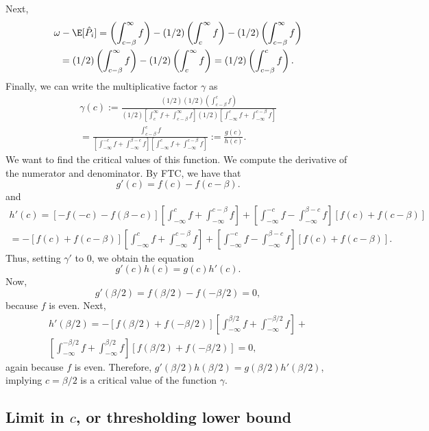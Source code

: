 \documentclass[12pt]{article}
\begin{document}
 Next,
\begin{multline*} \omega - \E[\hat{P}_i] = \left(\int_{c - \beta}^\infty f \right) - (1/2) \left( \int_{c}^\infty f \right) - (1/2) \left( \int_{c - \beta}^\infty f \right) \\ = (1/2) \left( \int_{c - \beta}^\infty f \right) - (1/2) \left( \int_{c}^\infty f \right) = (1/2) \left( \int_{c - \beta}^c f \right).\end{multline*} Finally, we can write the multiplicative factor $\gamma$ as
\begin{multline*} \gamma(c) := \frac{ (1/2)(1/2) \left(\int_{c - \beta}^c f\right) }{ (1/2) \left[\int_c^\infty f + \int_{c - \beta}^\infty f \right] (1/2) \left[\int_{-\infty}^c f + \int_{-\infty}^{c - \beta} f \right]} \\ = \frac{ \int_{c - \beta}^c f }{ \left[ \int_{-\infty}^{-c} f + \int_{-\infty}^{\beta - c} f \right] \left[ \int_{-\infty}^c f + \int_{-\infty}^{c - \beta} f \right] } := \frac{g(c)}{h(c)}.
\end{multline*} We want to find the critical values of this function. We compute the derivative of the numerator and denominator. By FTC, we have that
$$ g'(c) = f(c) - f(c - \beta).$$
and
\begin{multline*}
h'(c) = [-f(-c) - f(\beta - c)] \left[\int_{-\infty}^c f + \int_{-\infty}^{c - \beta} f \right] + \left[\int_{-\infty}^{-c} f -\int_{-\infty}^{\beta - c} f \right]\left[ f(c) + f(c - \beta) \right] \\= -[f(c) + f(c - \beta)] \left[\int_{-\infty}^c f + \int_{-\infty}^{c - \beta} f \right] + \left[\int_{-\infty}^{-c} f -\int_{-\infty}^{\beta - c} f \right]\left[ f(c) + f(c - \beta) \right].
\end{multline*} Thus, setting $\gamma'$ to $0$, we obtain the equation
$$ g'(c) h(c) = g(c) h'(c).$$
Now,
$$g'(\beta/2) = f(\beta/2) - f(-\beta/2) = 0,$$ because $f$ is even. Next, 
\begin{multline*}
h'(\beta/2) = - \left[ f(\beta/2) + f(-\beta/2) \right] \left[ \int_{-\infty}^{\beta/2} f + \int_{-\infty}^{-\beta/2} f \right] + \\ \left[\int_{-\infty}^{ -\beta/2 } f + \int_{-\infty}^{\beta/2} f \right] \left[ f(\beta/2) + f(-\beta/2) \right] = 0,
\end{multline*} again because $f$ is even. Therefore, $g'(\beta/2)h(\beta/2) = g(\beta/2)h'(\beta/2)$, implying $c = \beta/2$ is a critical value of the function $\gamma$.

\subsection{Limit in $c$, or thresholding lower bound}
\end{document}
